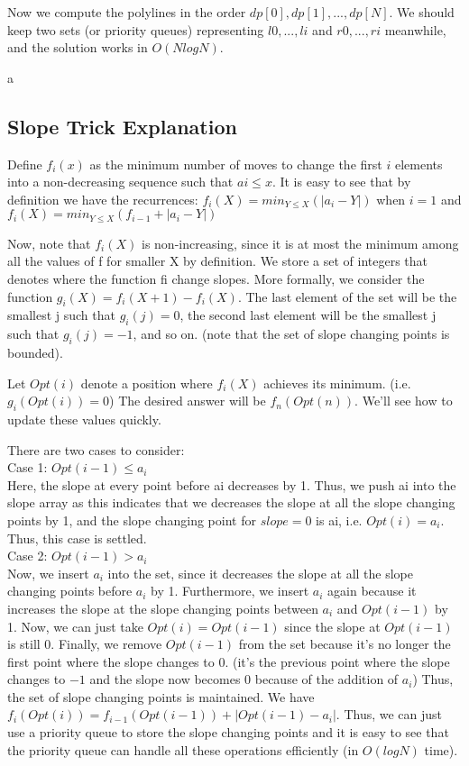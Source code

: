 Now we compute the polylines in the order $dp[0], dp[1], . . . , dp[N]$. We should keep two sets (or priority
queues) representing ${l0,...,li}$ and ${r0,...,ri}$ meanwhile, and the solution works in $O(NlogN)$. 


a\\

\subsection{Slope Trick Explanation}
Define $f_{i}(x)$ as the minimum number of moves to change the first $i$ elements into a non-decreasing sequence such that $ai \leq x$.
It is easy to see that by definition we have the recurrences:
$f_{i}(X) = min_{Y \leq X}(|a_{i}-Y|)$ when $i=1$
and
$f_{i}(X) = min_{Y \leq X}(f_{i-1}+|a_{i}-Y|)$

Now, note that $f_{i}(X)$ is non-increasing, since it is at most the minimum among all the values of f for smaller X by definition. We store a set of integers that denotes where the function fi change slopes. More formally, we consider the function $g_{i}(X) = f_{i}(X+1)-f_{i}(X)$. The last element of the set will be the smallest j such that $g_{i}(j)=0$, the second last element will be the smallest j such that $g_{i}(j)=-1$, and so on. 
(note that the set of slope changing points is bounded).

Let $Opt(i)$ denote a position where $f_{i}(X)$ achieves its minimum. (i.e. $g_{i}(Opt(i)) = 0$) The desired answer will be $f_{n}(Opt(n))$. We'll see how to update these values quickly.

There are two cases to consider: \\
Case 1: $Opt(i-1) \leq a_{i}$ \\
Here, the slope at every point before ai decreases by 1. Thus, we push ai into the slope array as this indicates that we decreases the slope at all the slope changing points by 1, 
and the slope changing point for $slope=0$ is ai, i.e. $Opt(i) = a_{i}$. Thus, this case is settled. \\

Case 2: $Opt(i-1) > a_{i}$ \\
Now, we insert $a_{i}$ into the set, since it decreases the slope at all the slope changing points before $a_{i}$ by 1. 
Furthermore, we insert $a_{i}$ again because it increases the slope at the slope changing points between $a_{i}$ and $Opt(i-1)$ by 1.
Now, we can just take $Opt(i) = Opt(i-1)$ since the slope at $Opt(i-1)$ is still 0. Finally, we remove $Opt(i-1)$
from the set because it's no longer the first point where the slope changes to 0. 
(it's the previous point where the slope changes to $-1$ and the slope now becomes 0 because of the addition of $a_{i}$)
Thus, the set of slope changing points is maintained. We have $f_{i}(Opt(i)) = f_{i-1}(Opt(i-1))+|Opt(i-1)-a_{i}|$.
Thus, we can just use a priority queue to store the slope changing points and it is easy to see that the priority queue can handle all these operations efficiently (in $O(log N)$ time). \\



